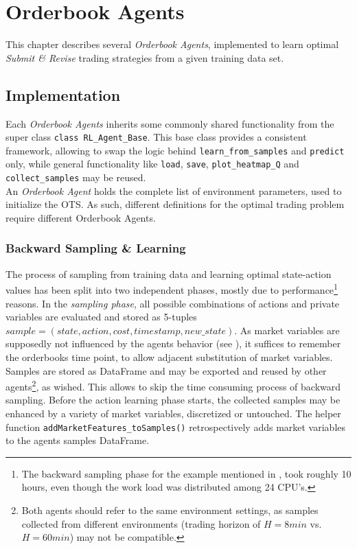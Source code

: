 \chapter{Orderbook Agents}
This chapter describes several \emph{Orderbook Agents}, implemented to learn optimal \emph{Submit \& Revise} trading strategies from a given training data set.


\section{Implementation}
\label{chap:experiments:implementation}
Each \emph{Orderbook Agents} inherits some commonly shared functionality from the super class \lstinline!class RL_Agent_Base!. This base class provides a consistent framework, allowing to swap the logic behind \lstinline!learn_from_samples! and \lstinline!predict! only, while general functionality like \lstinline!load!, \lstinline!save!, \lstinline!plot_heatmap_Q! and \lstinline!collect_samples! may be reused.\\

An \emph{Orderbook Agent} holds the complete list of environment parameters, used to initialize the \ac{OTS}. As such, different definitions for the optimal trading problem require different Orderbook Agents.


\subsection{Backward Sampling \& Learning}
The process of sampling from training data and learning optimal state-action values has been split into two independent phases, mostly due to performance\footnote{The backward sampling phase for the example mentioned in , took roughly 10 hours, even though the work load was distributed among 24 CPU's.} reasons. In the \emph{sampling phase}, all possible combinations of actions and private variables are evaluated and stored as 5-tuples $sample=(state, action, cost, timestamp, new\_state)$. As market variables are supposedly not influenced by the agents behavior (see ), it suffices to remember the orderbooks time point, to allow adjacent substitution of market variables.\\

Samples are stored as DataFrame and may be exported and reused by other agents\footnote{Both agents should refer to the same environment settings, as samples collected from different environments (\eg trading horizon of $H=8min$ vs. $H=60min$) may not be compatible.}, as wished. This allows to skip the time consuming process of backward sampling. Before the action learning phase starts, the collected samples may be enhanced by a variety of market variables, discretized or untouched. The helper function \lstinline!addMarketFeatures_toSamples()! retrospectively adds market variables to the agents samples DataFrame.\\

